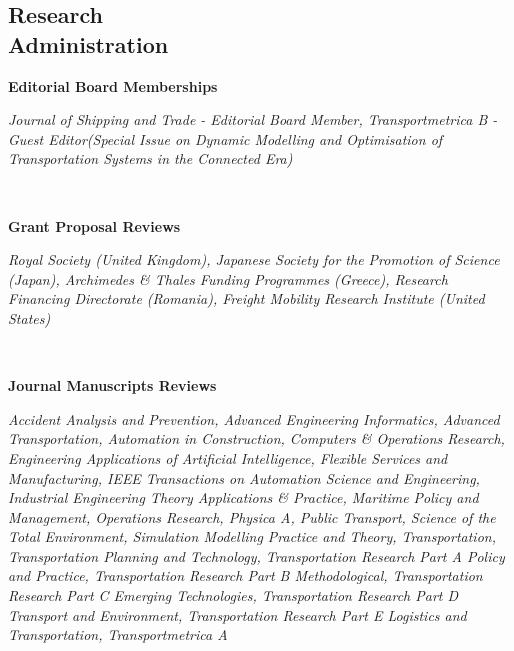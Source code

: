 \documentclass[margin]{res}
\begin{document}
\begin{resume}
\vspace{-0.10in}
\section{\sc Research\\ Administration}
\vspace{0.05in}
	\begin{minipage}{\textwidth}
	{\bf Editorial Board Memberships} \\
	\vspace{0.1in}
	\begin{minipage}{\textwidth}
	\setlength{\leftskip}{0.2in}
	\textit{
Journal of Shipping and Trade - Editorial Board Member, Transportmetrica B - Guest Editor(Special Issue on Dynamic Modelling and Optimisation of Transportation Systems in the Connected Era)	}
	\end{minipage}
	\end{minipage}
	\\
	\begin{minipage}{\textwidth}
	{\bf Grant Proposal Reviews} \\
	\vspace{0.1in}
	\begin{minipage}{\textwidth}
	\setlength{\leftskip}{0.2in}
	\textit{
Royal Society (United Kingdom), Japanese Society for the Promotion of Science (Japan), Archimedes \& Thales Funding Programmes (Greece), Research Financing Directorate (Romania), Freight Mobility Research Institute (United States)	}
	\end{minipage}
	\end{minipage}
	\\
	\begin{minipage}{\textwidth}
	{\bf Journal Manuscripts Reviews} \\
	\vspace{0.1in}
	\begin{minipage}{\textwidth}
	\setlength{\leftskip}{0.2in}
	\textit{
Accident Analysis and Prevention, Advanced Engineering Informatics, Advanced Transportation, Automation in Construction, Computers \& Operations Research, Engineering Applications of Artificial Intelligence, Flexible Services and Manufacturing, IEEE Transactions on Automation Science and Engineering, Industrial Engineering Theory Applications \& Practice, Maritime Policy and Management, Operations Research, Physica A, Public Transport, Science of the Total Environment, Simulation Modelling Practice and Theory, Transportation, Transportation Planning and Technology, Transportation Research Part A Policy and Practice, Transportation Research Part B Methodological, Transportation Research Part C Emerging Technologies, Transportation Research Part D Transport and Environment, Transportation Research Part E Logistics and Transportation, Transportmetrica A	}

\end{minipage}
\end{minipage}
\end{resume}
\end{document}
